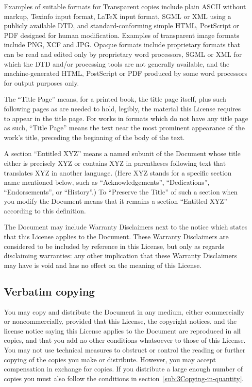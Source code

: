 Examples of suitable formats for Transparent copies include plain
ASCII without markup, Texinfo input format, \LaTeX{} input format,
SGML or XML using a publicly available DTD, and standard-conforming
simple HTML, Post\-Script or PDF designed for human modification.
Examples of transparent image formats include PNG, XCF and JPG. Opaque
formats include proprietary formats that can be read and edited only
by proprietary word processors, SGML or XML for which the DTD and/or
processing tools are not generally available, and the machine-generated
HTML, Post\-Script or PDF produced by some word processors for output
purposes only.

The ``Title Page'' means, for a printed book, the title page itself,
plus such following pages as are needed to hold, legibly, the material
this License requires to appear in the title page. For works in formats
which do not have any title page as such, ``Title Page'' means the
text near the most prominent appearance of the work's title, preceding
the beginning of the body of the text.

A section ``Entitled XYZ'' means a named subunit of the Document whose
title either is precisely XYZ or contains XYZ in parentheses following
text that translates XYZ in another language. (Here XYZ stands for
a specific section name mentioned below, such as ``Acknowledgements'',
``Dedications'', ``Endorsements'', or ``History''.) To ``Preserve
the Title'' of such a section when you modify the Document means that
it remains a section ``Entitled XYZ'' according to this definition.

The Document may include Warranty Disclaimers next to the notice which
states that this License applies to the Document. These Warranty Disclaimers
are considered to be included by reference in this License, but only
as regards disclaiming warranties: any other implication that these
Warranty Disclaimers may have is void and has no effect on the meaning
of this License.


\subsection{Verbatim copying\label{sub:2Verbatim-copying}}

You may copy and distribute the Document in any medium, either commercially
or noncommercially, provided that this License, the copyright notices,
and the license notice saying this License applies to the Document
are reproduced in all copies, and that you add no other conditions
whatsoever to those of this License. You may not use technical measures
to obstruct or control the reading or further copying of the copies
you make or distribute. However, you may accept compensation in exchange
for copies. If you distribute a large enough number of copies you
must also follow the conditions in section~\ref{sub:3Copying-in-quantity}.

